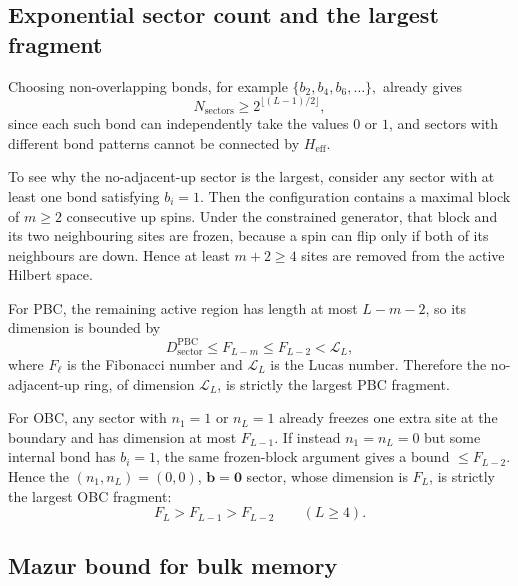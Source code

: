 \documentclass[aps,prb,reprint,twocolumn,amsmath,amssymb,citeautoscript]{revtex4-2}
\begin{document}
\subsection{Exponential sector count and the largest fragment}
\label{app:HSF:largest}

Choosing non-overlapping bonds, for example
\(
\{b_2,b_4,b_6,\dots\},
\)
already gives
\begin{equation}
N_{\mathrm{sectors}}\ge 2^{\lfloor (L-1)/2\rfloor},
\label{eq:app:sector_lower_bound}
\end{equation}
since each such bond can independently take the values \(0\) or \(1\), and sectors with different bond patterns cannot be connected by \(H_{\mathrm{eff}}\).

To see why the no-adjacent-up sector is the largest, consider any sector with at least one bond satisfying \(b_i=1\). Then the configuration contains a maximal block of \(m\ge 2\) consecutive up spins. Under the constrained generator, that block and its two neighbouring sites are frozen, because a spin can flip only if both of its neighbours are down. Hence at least \(m+2\ge 4\) sites are removed from the active Hilbert space.

For PBC, the remaining active region has length at most \(L-m-2\), so its dimension is bounded by
\begin{equation}
D_{\mathrm{sector}}^{\mathrm{PBC}}
\le F_{L-m}
\le F_{L-2}
< \mathcal{L}_L ,
\label{eq:app:pbc_largest_bound}
\end{equation}
where \(F_\ell\) is the Fibonacci number and \(\mathcal{L}_L\) is the Lucas number. Therefore the no-adjacent-up ring, of dimension \(\mathcal{L}_L\), is strictly the largest PBC fragment.

For OBC, any sector with \(n_1=1\) or \(n_L=1\) already freezes one extra site at the boundary and has dimension at most \(F_{L-1}\). If instead \(n_1=n_L=0\) but some internal bond has \(b_i=1\), the same frozen-block argument gives a bound \(\le F_{L-2}\). Hence the \((n_1,n_L)=(0,0)\), \(\mathbf{b}=\mathbf{0}\) sector, whose dimension is \(F_L\), is strictly the largest OBC fragment:
\begin{equation}
F_L > F_{L-1} > F_{L-2}\qquad (L\ge 4).
\label{eq:app:obc_largest_bound}
\end{equation}

\subsection{Mazur bound for bulk memory}
\label{app:HSF:mazur}
\end{document}
